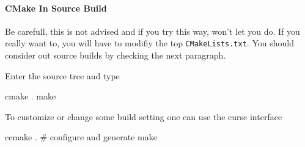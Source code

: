 \paragraph{CMake In Source Build}

Be carefull, this is not advised and if you try this way, \cmake won't let you do. If you really want to, you will have to modifiy the top \lstinline|CMakeLists.txt|. You should consider out source builds by checking the next paragraph.

Enter the source tree and type
\begin{unixcom}
  cmake .
  make
\end{unixcom}

To customize or change some build setting one can use the \cmake curse interface
\ccmake
\begin{unixcom}
  ccmake . # configure and generate
  make
\end{unixcom}












